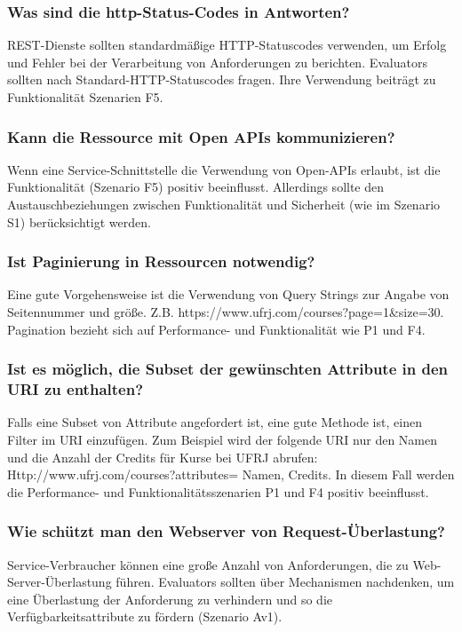 \documentclass{acmsiggraph}
\begin{document}
\subsubsection{Was sind die http-Status-Codes in Antworten?}
REST-Dienste sollten standardmäßige HTTP-Statuscodes verwenden, um Erfolg und Fehler bei der Verarbeitung von Anforderungen zu berichten.
Evaluators sollten nach Standard-HTTP-Statuscodes fragen. Ihre Verwendung beiträgt zu Funktionalität Szenarien F5.
\subsubsection{Kann die Ressource mit Open APIs kommunizieren?}
Wenn eine Service-Schnittstelle die Verwendung von Open-APIs erlaubt, ist die Funktionalität (Szenario F5) positiv beeinflusst.
Allerdings sollte den Austauschbeziehungen zwischen Funktionalität und Sicherheit (wie im Szenario S1) berücksichtigt werden.
\subsubsection{Ist Paginierung in Ressourcen notwendig?}
Eine gute Vorgehensweise ist die Verwendung von Query Strings zur Angabe von Seitennummer und größe. 
\newline Z.B. https://www.ufrj.com/courses?page=1\&size=30. \newline
Pagination bezieht sich auf Performance- und Funktionalität wie P1 und F4.
\subsubsection{Ist es möglich, die Subset der gewünschten Attribute in den URI zu enthalten?}

Falls eine Subset von Attribute angefordert ist, eine gute Methode ist, einen Filter im URI einzufügen. Zum Beispiel wird der folgende URI nur den Namen und die Anzahl der Credits für Kurse bei UFRJ abrufen:\newline
Http://www.ufrj.com/courses?attributes= Namen, Credits. \newline
In diesem Fall werden die Performance- und Funktionalitätsszenarien P1 und F4 positiv beeinflusst.

\subsubsection{Wie schützt man den Webserver von Request-Überlastung?}
Service-Verbraucher können eine große Anzahl von Anforderungen, die zu Web-Server-Überlastung führen.
Evaluators sollten über Mechanismen nachdenken, um eine Überlastung der Anforderung zu verhindern und so die Verfügbarkeitsattribute zu fördern (Szenario Av1).
\end{document}
